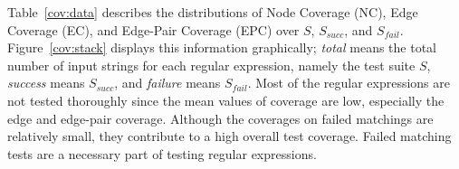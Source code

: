 
Table~\ref{cov:data} describes the distributions of Node Coverage (NC), Edge Coverage (EC), and Edge-Pair Coverage (EPC) over $S$, $S_{succ}$, and $S_{fail}$. Figure~\ref{cov:stack} displays this information graphically; {\em total} means the total number of input strings for each regular expression, namely the test suite $S$, {\em success} means  $S_{succ}$, and {\em failure} means $S_{fail}$. %
Most of the regular expressions are not tested thoroughly since the mean values of coverage are low, especially the edge and edge-pair coverage. 
Although the coverages on failed matchings are relatively small, they contribute to a high overall test coverage. Failed matching tests are a necessary part of testing regular expressions.%



